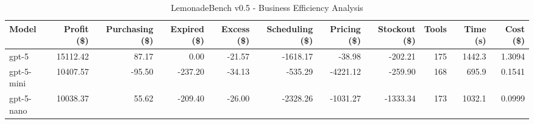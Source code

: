 \begin{table}[h]
\centering
\caption{LemonadeBench v0.5 - Business Efficiency Analysis}
\label{tab:lemonadebench_v05_efficiency}
\begin{tabular}{|l|r|r|r|r|r|r|r|r|r|r|}
\hline
\textbf{Model} & \textbf{Profit (\$)} & \textbf{Purchasing (\$)} & \textbf{Expired (\$)} & \textbf{Excess (\$)} & \textbf{Scheduling (\$)} & \textbf{Pricing (\$)} & \textbf{Stockout (\$)} & \textbf{Tools} & \textbf{Time (s)} & \textbf{Cost (\$)} \\
\hline
gpt-5 & 15112.42 & 87.17 & 0.00 & -21.57 & -1618.17 & -38.98 & -202.21 & 175 & 1442.3 & 1.3094 \\
\hline
gpt-5-mini & 10407.57 & -95.50 & -237.20 & -34.13 & -535.29 & -4221.12 & -259.90 & 168 & 695.9 & 0.1541 \\
\hline
gpt-5-nano & 10038.37 & 55.62 & -209.40 & -26.00 & -2328.26 & -1031.27 & -1333.34 & 173 & 1032.1 & 0.0999 \\
\hline
\end{tabular}
\end{table}
